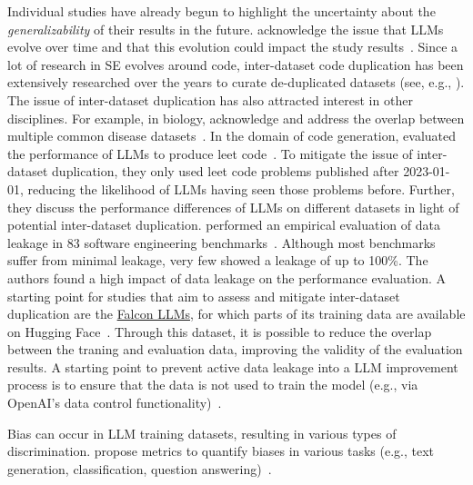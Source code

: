 Individual studies have already begun to highlight the uncertainty about the \emph{generalizability} of their results in the future. \citeauthor{DBLP:conf/msr/JesseADM23} acknowledge the issue that LLMs evolve over time and that this evolution could impact the study results~\cite{DBLP:conf/msr/JesseADM23}.
Since a lot of research in SE evolves around code, inter-dataset code duplication has been extensively researched over the years to curate de-duplicated datasets (see, e.g., \cite{DBLP:journals/pacmpl/LopesMMSYZSV17, DBLP:conf/oopsla/Allamanis19, DBLP:journals/ese/KarmakarAR23, DBLP:journals/tse/LopezCSSV25}).
The issue of inter-dataset duplication has also attracted interest in other disciplines. %
For example, in biology, \citeauthor{DBLP:journals/biodb/LakiotakiVTGT18} acknowledge and address the overlap between multiple common disease datasets~\cite{DBLP:journals/biodb/LakiotakiVTGT18}. 
In the domain of code generation, \citeauthor{DBLP:conf/ease/CoignionQR24} evaluated the performance of LLMs to produce leet code~\cite{DBLP:conf/ease/CoignionQR24}.
To mitigate the issue of inter-dataset duplication, they only used leet code problems published after 2023-01-01, reducing the likelihood of LLMs having seen those problems before.
Further, they discuss the performance differences of LLMs on different datasets in light of potential inter-dataset duplication.
\citeauthor{zhou2025lessleakbenchinvestigationdataleakage} performed an empirical evaluation of data leakage in 83 software engineering benchmarks~\cite{zhou2025lessleakbenchinvestigationdataleakage}.
Although most benchmarks suffer from minimal leakage, very few showed a leakage of up to 100\%.
The authors found a high impact of data leakage on the performance evaluation.
A starting point for studies that aim to assess and mitigate inter-dataset duplication are the \href{https://huggingface.co/datasets/tiiuae/falcon-refinedweb}{Falcon LLMs}, for which parts of its training data are available on Hugging Face~\cite{technology_innovation_institute_2023}.
Through this dataset, it is possible to reduce the overlap between the traning and evaluation data, improving the validity of the evaluation results.
A starting point to prevent active data leakage into a LLM improvement process is to ensure that the data is not used to train the model (e.g., via OpenAI's data control functionality)~\cite{DBLP:conf/eacl/BalloccuSLD24}.

Bias can occur in LLM training datasets, resulting in various types of discrimination.
\citeauthor{DBLP:journals/corr/abs-2309-00770} propose metrics to quantify biases in various tasks (e.g., text generation, classification, question answering)~\cite{DBLP:journals/corr/abs-2309-00770}.

